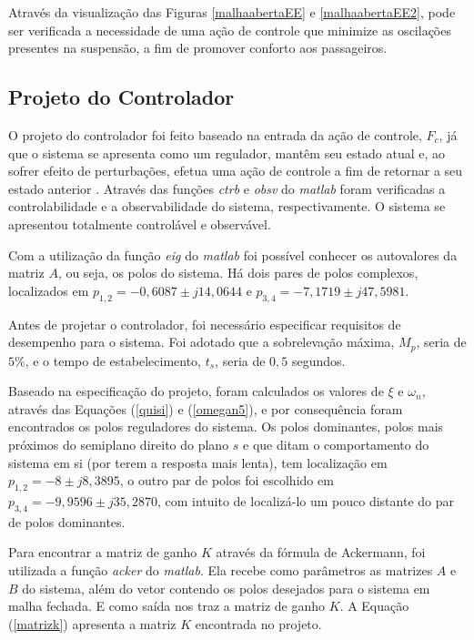 \documentclass[journal,brazil,english]{IEEEtran}
\begin{document}
Através da visualização das Figuras \ref{malhaabertaEE} e \ref{malhaabertaEE2}, pode ser verificada a necessidade de uma ação de controle que minimize as oscilações presentes na suspensão, a fim de promover conforto aos passageiros.

\subsection{Projeto do Controlador}\label{projetoControlador1}
O projeto do controlador foi feito baseado na entrada da ação de controle, $F_c$, já que o sistema se apresenta como um regulador, mantêm seu estado atual e, ao sofrer efeito de perturbações, efetua uma ação de controle a fim de retornar a seu estado anterior \cite{ogata}. Através das funções \textit{ctrb} e \textit{obsv} do \textit{matlab} foram verificadas a controlabilidade e a observabilidade do sistema, respectivamente. O sistema se apresentou totalmente controlável e observável.

Com a utilização da função \textit{eig} do \textit{matlab} foi possível conhecer os autovalores da matriz $A$, ou seja, os polos do sistema. Há dois pares de polos complexos, localizados em $p_{1,2}= -0,6087 \pm j14,0644$ e $p_{3,4}=-7,1719 \pm j47,5981$.

Antes de projetar o controlador, foi necessário especificar requisitos de desempenho para o sistema. Foi adotado que a sobrelevação máxima, $M_p$, seria de $5\%$, e o tempo de estabelecimento, $t_s$, seria de $0,5$ segundos.

Baseado na especificação do projeto, foram calculados os valores de $\xi$ e $\omega _n$, através das Equações (\ref{quisi}) e (\ref{omegan5}), e por consequência foram encontrados os polos reguladores do sistema. Os polos dominantes, polos mais próximos do semiplano direito do plano $s$ e que ditam o comportamento do sistema em si (por terem a resposta mais lenta), tem localização em $p_{1,2} = -8 \pm j8,3895$, o outro par de polos foi escolhido em $p_{3,4} = -9,9596 \pm j35,2870$, com intuito de localizá-lo um pouco distante do par de polos dominantes.

Para encontrar a matriz de ganho $K$ através da fórmula de Ackermann, foi utilizada a função \textit{acker} do \textit{matlab}. Ela recebe como parâmetros as matrizes $A$ e $B$ do sistema, além do vetor contendo os polos desejados para o sistema em malha fechada. E como saída nos traz a matriz de ganho $K$. A Equação (\ref{matrizk}) apresenta a matriz $K$ encontrada no projeto.
\end{document}
